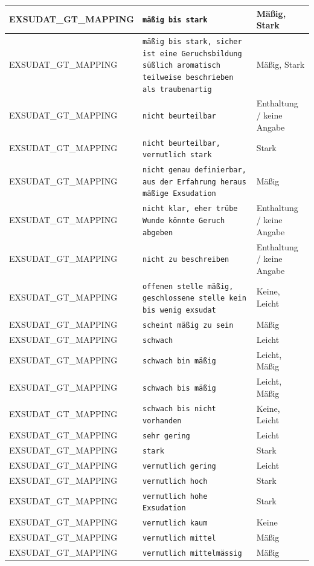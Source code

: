 \begin{longtable}{|p{3.5cm}|p{5cm}|p{6.5cm}|}
EXSUDAT\_GT\_MAPPING & \texttt{mäßig bis stark} & Mäßig, Stark \\ \hline
EXSUDAT\_GT\_MAPPING & \texttt{mäßig bis stark, sicher ist eine Geruchsbildung süßlich aromatisch teilweise beschrieben als traubenartig} & Mäßig, Stark \\ \hline
EXSUDAT\_GT\_MAPPING & \texttt{nicht beurteilbar} & Enthaltung / keine Angabe \\ \hline
EXSUDAT\_GT\_MAPPING & \texttt{nicht beurteilbar, vermutlich stark} & Stark \\ \hline
EXSUDAT\_GT\_MAPPING & \texttt{nicht genau definierbar, aus der Erfahrung heraus mäßige Exsudation} & Mäßig \\ \hline
EXSUDAT\_GT\_MAPPING & \texttt{nicht klar, eher trübe Wunde könnte Geruch abgeben} & Enthaltung / keine Angabe \\ \hline
EXSUDAT\_GT\_MAPPING & \texttt{nicht zu beschreiben} & Enthaltung / keine Angabe \\ \hline
EXSUDAT\_GT\_MAPPING & \texttt{offenen stelle mäßig, geschlossene stelle kein bis wenig exsudat} & Keine, Leicht \\ \hline
EXSUDAT\_GT\_MAPPING & \texttt{scheint mäßig zu sein} & Mäßig \\ \hline
EXSUDAT\_GT\_MAPPING & \texttt{schwach} & Leicht \\ \hline
EXSUDAT\_GT\_MAPPING & \texttt{schwach bin mäßig} & Leicht, Mäßig \\ \hline
EXSUDAT\_GT\_MAPPING & \texttt{schwach bis mäßig} & Leicht, Mäßig \\ \hline
EXSUDAT\_GT\_MAPPING & \texttt{schwach bis nicht vorhanden} & Keine, Leicht \\ \hline
EXSUDAT\_GT\_MAPPING & \texttt{sehr gering} & Leicht \\ \hline
EXSUDAT\_GT\_MAPPING & \texttt{stark} & Stark \\ \hline
EXSUDAT\_GT\_MAPPING & \texttt{vermutlich gering} & Leicht \\ \hline
EXSUDAT\_GT\_MAPPING & \texttt{vermutlich hoch} & Stark \\ \hline
EXSUDAT\_GT\_MAPPING & \texttt{vermutlich hohe Exsudation} & Stark \\ \hline
EXSUDAT\_GT\_MAPPING & \texttt{vermutlich kaum} & Keine \\ \hline
EXSUDAT\_GT\_MAPPING & \texttt{vermutlich mittel} & Mäßig \\ \hline
EXSUDAT\_GT\_MAPPING & \texttt{vermutlich mittelmässig} & Mäßig \\ \hline

\end{longtable}
